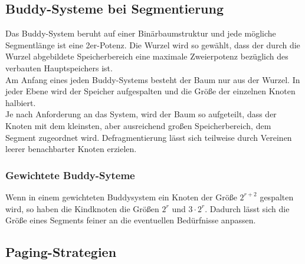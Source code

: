 \documentclass[11pt]{scrartcl}
\begin{document}
\subsection{Buddy-Systeme bei Segmentierung} %
Das Buddy-System beruht auf einer Binärbaumstruktur und jede mögliche Segmentlänge ist eine 2er-Potenz. Die Wurzel wird so gewählt, dass der durch die Wurzel abgebildete Speicherbereich eine maximale Zweierpotenz bezüglich des verbauten Hauptspeichers ist. \\
Am Anfang eines jeden Buddy-Systems besteht der Baum nur aus der Wurzel. In jeder Ebene wird der Speicher aufgespalten und die Größe der einzelnen Knoten halbiert.\\
Je nach Anforderung an das System, wird der Baum so aufgeteilt, dass der Knoten mit dem kleinsten, aber ausreichend großen Speicherbereich, dem Segment zugeordnet wird. Defragmentierung lässt sich teilweise durch Vereinen leerer benachbarter Knoten erzielen.

\subsubsection{Gewichtete Buddy-Syteme}
Wenn in einem gewichteten Buddysystem ein Knoten der Größe $2^{r+2}$ gespalten wird, so haben die Kindknoten die Größen $2^r$ und $3 \cdot 2^r$. Dadurch lässt sich die Größe eines Segments feiner an die eventuellen Bedürfnisse anpassen.

\subsection{Paging-Strategien}
\end{document}
